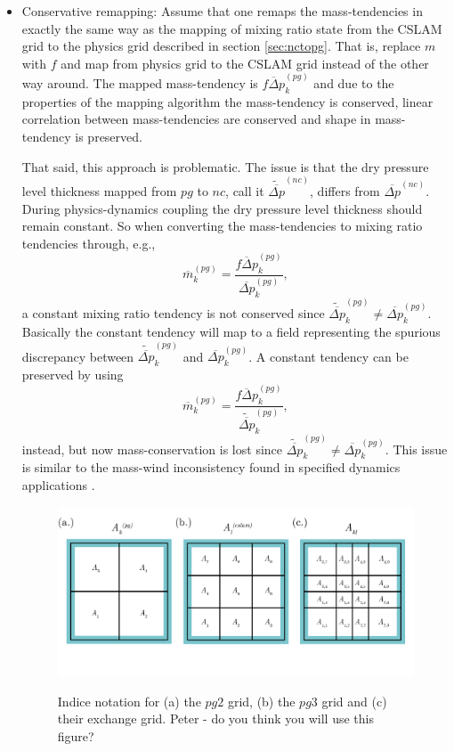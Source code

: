 \begin{itemize}
\item Conservative remapping: Assume that one remaps the mass-tendencies in exactly the same way as the mapping of mixing ratio state from the CSLAM grid to the physics grid described in section \ref{sec:nctopg}. That is, replace $m$ with $f$ and map from physics grid to the CSLAM grid instead of the other way around. The mapped mass-tendency is $\overline{f\Delta p}^{(pg)}_k$ and due to the properties of the mapping algorithm the mass-tendency is conserved, linear correlation between mass-tendencies are conserved and shape in mass-tendency is preserved.

That said, this approach is problematic. The issue is that the dry pressure level thickness mapped from $pg$ to $nc$, call it $\widetilde{\overline{\Delta p}}^{(nc)}$, differs from $\overline{\Delta p}^{(nc)}$. During physics-dynamics coupling the dry pressure level thickness should remain constant. So when converting the mass-tendencies to mixing ratio tendencies through, e.g.,
\begin{equation}
\overline{m}^{(pg)}_k=\frac{\overline{f\Delta p}^{(pg)}_k}{\overline{\Delta p}^{(pg)}_k},
\end{equation}
a constant mixing ratio tendency is not conserved since $\widetilde{\overline{\Delta p}}^{(pg)}_k\ne {\overline{\Delta p}}^{(pg)}_k$. Basically the constant tendency will map to a field representing the spurious discrepancy between $\widetilde{\overline{\Delta p}}^{(pg)}_k$ and ${\overline{\Delta p}}^{(pg)}_k$. A constant tendency can be preserved by using
\begin{equation}
\overline{m}^{(pg)}_k=\frac{\overline{f\Delta p}^{(pg)}_k}{\widetilde{\overline{\Delta p}}^{(pg)}_k},
\end{equation}
instead, but now mass-conservation is lost since $\widetilde{\overline{\Delta p}}^{(pg)}_k\ne {\overline{\Delta p}}^{(pg)}_k$. This issue is similar to the mass-wind inconsistency found in specified dynamics applications \citep[e.g.][]{JKLSBCRE2001QJR}. 

\begin{figure}[t]
\begin{center}
\noindent\includegraphics[width=30pc,angle=0]{figs/area-schematic.png}\\
\end{center}
\caption{Indice notation for (a) the $pg2$ grid, (b) the $pg3$ grid and (c) their exchange grid. {\color{red}Peter - do you think you will use this figure?}}
\label{fig:area-schematic}
\end{figure}


\end{itemize}
